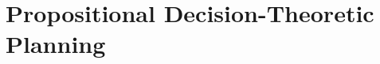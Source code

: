 \documentclass{article}
\begin{document}










\section{Propositional Decision-Theoretic Planning}
\end{document}
